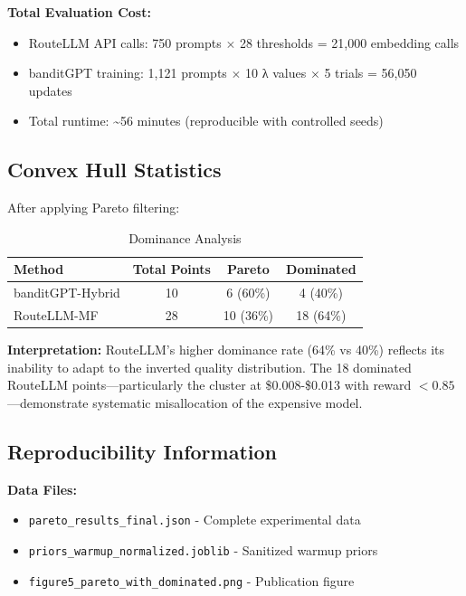 \textbf{Total Evaluation Cost:}
\begin{itemize}
    \item RouteLLM API calls: 750 prompts $\times$ 28 thresholds = 21,000 embedding calls
    \item banditGPT training: 1,121 prompts $\times$ 10 λ values $\times$ 5 trials = 56,050 updates
    \item Total runtime: \textasciitilde56 minutes (reproducible with controlled seeds)
\end{itemize}

\subsection*{Convex Hull Statistics}

After applying Pareto filtering:

\begin{table}[H]
\centering
\caption{Dominance Analysis}
\begin{tabular}{lccc}
\toprule
\textbf{Method} & \textbf{Total Points} & \textbf{Pareto} & \textbf{Dominated} \\
\midrule
banditGPT-Hybrid & 10 & 6 (60\%) & 4 (40\%) \\
RouteLLM-MF & 28 & 10 (36\%) & 18 (64\%) \\
\bottomrule
\end{tabular}
\end{table}

\textbf{Interpretation:} RouteLLM's higher dominance rate (64\% vs 40\%) reflects its inability to adapt to the inverted quality distribution. The 18 dominated RouteLLM points---particularly the cluster at \$0.008-\$0.013 with reward $< 0.85$---demonstrate systematic misallocation of the expensive model.

\subsection*{Reproducibility Information}

\textbf{Data Files:}
\begin{itemize}
    \item \texttt{pareto\_results\_final.json} - Complete experimental data
    \item \texttt{priors\_warmup\_normalized.joblib} - Sanitized warmup priors
    \item \texttt{figure5\_pareto\_with\_dominated.png} - Publication figure
\end{itemize}

